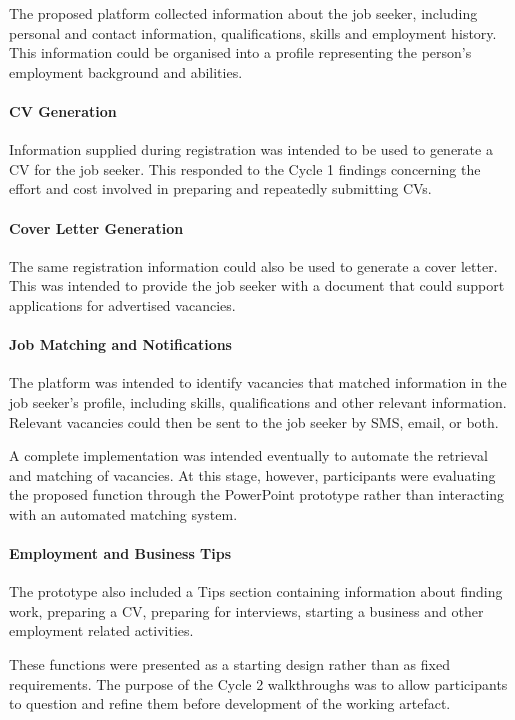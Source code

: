 The proposed platform collected information about the job seeker, including personal and contact information, qualifications, skills and employment history. This information could be organised into a profile representing the person's employment background and abilities.

\paragraph{CV Generation}

Information supplied during registration was intended to be used to generate a CV for the job seeker. This responded to the Cycle 1 findings concerning the effort and cost involved in preparing and repeatedly submitting CVs.

\paragraph{Cover Letter Generation}

The same registration information could also be used to generate a cover letter. This was intended to provide the job seeker with a document that could support applications for advertised vacancies.

\paragraph{Job Matching and Notifications}

The platform was intended to identify vacancies that matched information in the job seeker's profile, including skills, qualifications and other relevant information. Relevant vacancies could then be sent to the job seeker by SMS, email, or both.

A complete implementation was intended eventually to automate the retrieval and matching of vacancies. At this stage, however, participants were evaluating the proposed function through the PowerPoint prototype rather than interacting with an automated matching system.

\paragraph{Employment and Business Tips}

The prototype also included a Tips section containing information about finding work, preparing a CV, preparing for interviews, starting a business and other employment related activities.

These functions were presented as a starting design rather than as fixed requirements. The purpose of the Cycle 2 walkthroughs was to allow participants to question and refine them before development of the working artefact.



